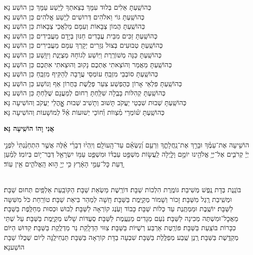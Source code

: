 \documentclass[twoside, openany, parskip=half, 11pt]{book}
\begin{document}
\begin{small}
כְּהוֹשַֽׁעְתָּ אֵלִים בְּלוּד עִמָּךְ בְּצֵאתְךָ לְיֵֽשַׁע עַמָּךְ \hfill כֵּן הוֹשַׁע נָא׃ \\
כְּהוֹשַֽׁעְתָּ גּוֹי וֵאלֹהִים דְּרוּשִׁים לְיֵֽשַׁע אֱלֹהִים \hfill כֵּן הוֹשַׁע נָא׃ \\
כְּהוֹשַֽׁעְתָּ הֲמוֹן צְבָאוֹת וְעִמָּם מַלְאֲכֵי צְבָאוֹת \hfill כֵּן הוֹשַׁע נָא׃ \\
כְּהוֹשַֽׁעְתָּ זַכִּים מִבֵּית עֲבָדִים חַנּוּן בְּיָדָם מַעֲבִידִים \hfill כֵּן הוֹשַׁע נָא׃ \\
כְּהוֹשַֽׁעְתָּ טְבוּעִים בְּצוּל גְּזָרִים יְקָרְךָ עִמָּם מַעֲבִירִים \hfill כֵּן הוֹשַׁע נָא׃ \\
כְּהוֹשַֽׁעְתָּ כַּנָּה מְשׁוֹרֶֽרֶת וַיּֽוֹשַׁע לְגוֹחָהּ מְצֻיֶּנֶת וַיִוָּֽשַׁע \hfill כֵּן הוֹשַׁע נָא׃ \\
כְּהוֹשַֽׁעְתָּ מַאֲמַר וְהוֹצֵאתִי אֶתְכֶם נָקוּב וְהוּצֵאתִי אִתְּכֶם \hfill כֵּן הוֹשַׁע נָא׃\\
כְּהוֹשַֽׁעְתָּ סוֹבְבֵי מִזְבֵּֽחַ עוֹמְסֵי עֲרָבָה לְהַקִּיף מִזְבֵּֽחַ \hfill כֵּן הוֹשַׁע נָא׃ \\
כְּהוֹשַֽׁעְתָּ פִּלְאֵי אָרוֹן כְּהֻפְשַׁע צִעֵר פְּלֶֽשֶׁת בַּחֲרוֹן אַף וְנוֹשַׁע \hfill כֵּן הוֹשַׁע נָא׃\\
כְּהוֹשַֽׁעְתָּ קְהִלּוֹת בָּבֶֽלָה שִׁלַּֽחְתָּ רַחוּם לְמַעֲנָם שֻׁלַּחְתָּ \hfill כֵּן הוֹשַׁע נָא׃\\

כְּהוֹשַֽׁעְתָּ שְׁבוּת שִׁבְטֵי יַעֲקֹב תָּשׁוּב וְתָשִׁיב שְׁבוּת אׇׇׇׇׇהֳלֵי יַעֲקֹב \hfill וְהוֹשִׁיעָה נָּא׃\\
כְּהוֹשַֽׁעְתָּ שׁ֗וֹמְרֵי מִ֗צְווֹת וְ֗חוֹכֵי יְשׁוּעוֹת אֵ֗ל֗ לְמוֹשָׁעוֹת \hfill וְהוֹשִׁיעָה נָּא׃

\end{small}

\begin{large}
\textbf{אֲנִי וָהוֹ הוֹשִֽׁיעָה נָּא׃}
\end{large}

הוֹשִׁ֤יעָה אֶת־עַמֶּ֗ךָ וּבָרֵ֥ךְ אֶת־נַֽחֲלָתֶ֑ךָ וּֽרְעֵ֥ם וְ֝נַשְּׂאֵ֗ם עַד־הָֽעוֹלָֽם׃ וְיִֽהְי֨וּ דְבָרַ֜י אֵ֗לֶּה אֲשֶׁ֤ר הִתְחַנַּ֨נְתִּי֙ לִפְנֵ֣י יְיָ֔ קְרֹבִ֛ים אֶל־יְיָ֥ אֱלֹהֵ֖ינוּ יוֹמָ֣ם וָלָ֑יְלָה לַֽעֲשׂ֣וֹת מִשְׁפַּ֣ט עַבְדּ֗וֹ וּמִשְׁפַּ֛ט עַמּ֥וֹ יִשְׂרָאֵ֖ל דְּבַר־י֥וֹם בְּיוֹמֽוֹ׃ לְמַ֗עַן דַּ֚עַת כׇּל־עַמֵּ֣י הָאָ֔רֶץ כִּ֥י יְיָ֖ ה֣וּא הָֽאֱלֹהִ֑ים אֵ֖ין עֽוֹד׃

\sepline

\\
בּוֹנֶֽנֶת בְּדָת נֶֽפֶשׁ מְשִׁיבַת׃ גּוֹמֶֽרֶת הִלְכוֹת שַׁבָּת׃ דּוֹרֶֽשֶׁת מַשְׂאַת שַׁבָּת׃ הַקּוֹבַֽעַת אַלְפַּֽיִם תְּחוּם שַׁבָּת׃ וּמְשִֽׁיבַת רֶֽגֶל מִשַּׁבָּת׃ זָכוֹר וְשָׁמוֹר מְקַיֶּֽמֶת בַּשַּׁבָּת׃ חָֽשָׁה לְמַהֵר בִּיאַת שַׁבָּת׃ טוֹרַֽחַת כֹּל מִשִּׁשָּה לַשַּׁבָּת׃ יוֹשֶֽׁבֶת וּמַמְתֶּֽנֶת עַד כְּלוֹת שַׁבָּת׃ כָּבוֹד וָעֹֽנֶג קוֹרְאָה לַשַּׁבָּת׃ לְבוּשׁ וּכְסוּת מְחַלֶּֽפֶת בַּשַּׁבָּת׃ מַאֲכׇל־וּמִשְׁתֶּה מְכִינָה לַשַּׁבָּת׃ נֹֽעַם מְגָדִים מַנְעֶֽמֶת לַשַּׁבָּת׃ סְעֻדּוֹת שָׁלֹשׁ מְקַיֶּֽמֶת בַּשַּׁבָּת׃ עַל שְׁתֵּי כִכָּרוֹת בּוֹצַֽעַת בַּשַּׁבָּת׃ פּוֹרֶֽטֶת אַרְבַּע רְשֻׁיּוֹת בַּשַּׁבָּת׃ צִוּוּי הַדְלָֽקַת נֵר מַדְלֶֽקֶת בַּשַּׁבָּת׃ קִדּוּשׁ הַיּוֹם מְקַדֶּֽשֶׁת בַּשַּׁבָּת׃ רֶֽנֶן שֶֽׁבַע מְפַלֶּֽלֶת בַּשַּׁבָּת׃ שִׁבְעָה בַדָּת קוֹרְאָה בַּשַּׁבָּת׃ תַּנְחִילֶֽנָּה לְיוֹם שֶׁכֻּלּוֹ שַׁבָּת הוֹשַׁענָא׃
\end{document}
